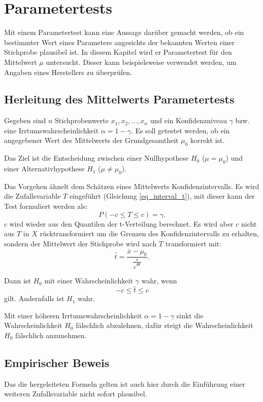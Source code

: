 \documentclass[10pt,twocolumn]{scrartcl}
\begin{document}
\section{Parametertests}
		Mit einem Parametertest kann eine Aussage darüber gemacht werden, ob ein bestimmter Wert eines Parameters angesichts der bekannten Werten einer Stichprobe plausibel ist. In diesem Kapitel wird er Parametertest für den Mittelwert $\mu$ untersucht. Dieser kann beispielsweise verwendet werden, um Angaben eines Herstellers zu überprüfen.
	\subsection{Herleitung des Mittelwerts Parametertests}
		Gegeben sind $n$ Stichprobenwerte $x_1, x_2, ..., x_n$ und ein Konfidenzniveau $\gamma$ bzw. eine Irrtumswahrscheinlichkeit $\alpha = 1 - \gamma$. Es soll getestet werden, ob ein angegebener Wert des Mittelwerts der Grundgesamtheit $\mu_0$ korrekt ist.

		Das Ziel ist die Entscheidung zwischen einer Nullhypothese $H_0$ ($\mu = \mu_0$) und einer Alternativhypothese $H_1$ ($\mu \ne \mu_0$).

		Das Vorgehen ähnelt dem Schätzen eines Mittelwerts Konfidenzintervalls. Es wird die Zufallsvariable $T$ eingeführt (Gleichung \ref{eq_interval_t}), mit dieser kann der Test formuliert werden als:
		\begin{equation}
		P(-c \le T \le c) = \gamma .
		\end{equation}
		$c$ wird wieder aus den Quantilen der t-Verteilung berechnet. Es wird aber $c$ nicht aus $T$ in $X$ rücktransformiert um die Grenzen des Konfidenzintervalls zu erhalten, sondern der Mittelwert der Stichprobe wird nach $T$ transformiert mit:
		\begin{equation}
		\hat{t} = \frac{\overline{x} - \mu_0}{\frac{s}{\sqrt{n}}} .
		\end{equation}

		Dann ist $H_0$ mit einer Wahrscheinlichkeit $\gamma$ wahr, wenn
		\begin{equation}
		-c \le \hat{t} \le c
		\end{equation}
		gilt. Andernfalls ist $H_1$ wahr.

		Mit einer höheren Irrtumswahrscheinlichkeit $\alpha = 1 - \gamma$ sinkt die Wahrscheinlichkeit $H_0$ fälschlich abzulehnen, dafür steigt die Wahrscheinlichkeit $H_0$ fälschlich anzunehmen.
	\subsection{Empirischer Beweis}
		Das die hergeleiteten Formeln gelten ist auch hier durch die Einführung einer weiteren Zufallsvariable nicht sofort plausibel.
\end{document}
